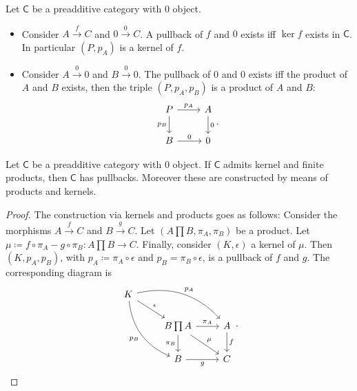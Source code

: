 \begin{ex}
	Let $\mathsf{C}$ be a preadditive category with $0$ object.
	\begin{itemize}
	\item Consider $A \xrightarrow{f} C$ and $0 \xrightarrow{0} C$.
		A pullback of $f$ and $0$ exists iff $\ker f$ exists in $\mathsf{C}$.
		In particular $\left(P, p_A\right)$ is a kernel of $f$.
	\item Consider $A \xrightarrow{0} 0$ and $B \xrightarrow{0} 0$.
		The pullback of $0$ and $0$ exists iff the product of $A$ and $B$ exists, then the triple $\left(P, p_A, p_B\right)$ is a product of $A$ and $B$:
		\begin{equation}
		\begin{tikzcd}
			P \arrow[r, "p_A", rightarrow] \arrow[d, "p_B"', rightarrow] & A \arrow[d, "0", rightarrow] \\
			B \arrow[r, "0", rightarrow] & 0
		\end{tikzcd}
		.\end{equation} 
	\end{itemize}
\end{ex} 

\begin{prop}
	Let $\mathsf{C}$ be a preadditive category with $0$ object.
	If $\mathsf{C}$ admits kernel and finite products, then $\mathsf{C}$ has pullbacks.
	Moreover these are constructed by means of products and kernels.
\end{prop} 
\begin{proof}
	The construction via kernels and products goes as follows:
	Consider the morphisms $A \xrightarrow{f} C$ and $B \xrightarrow{g} C$.
	Let $\left(A \prod B, \pi_A, \pi_B\right)$ be a product.
	Let $\mu \coloneqq f \circ \pi_A - g \circ \pi_B\colon A \prod B \to C$.
	Finally, consider $\left(K, \epsilon\right)$ a kernel of $\mu$.
	Then $\left(K, p_A, p_B\right)$, with $p_A \coloneqq \pi_A \circ \epsilon$ and $p_B = \pi_B \circ \epsilon$, is a pullback of $f$ and $g$.
	The corresponding diagram is
	\begin{equation}
	\begin{tikzcd}
		K \arrow[rd, "\epsilon", rightarrow] \arrow[rrd, "p_A", rightarrow, bend left] \arrow[rdd, "p_B"', rightarrow, bend right] & & \\
	   & B \prod A \arrow[r, "\pi_A", rightarrow] \arrow[d, "\pi_B"', rightarrow] \arrow[rd, "\mu", rightarrow] & A \arrow[d, "f", rightarrow] \\
	   & B \arrow[r, "g"', rightarrow] & C
	\end{tikzcd}
	.\end{equation} 
\end{proof}

